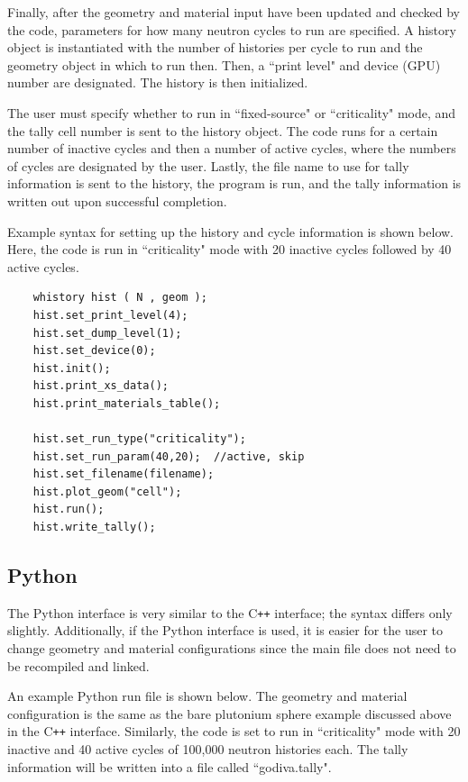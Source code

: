 \documentclass[twoside,a4paper]{refart}
\begin{document}
Finally, after the geometry and material input have been updated and checked by the code, parameters for 
how many neutron cycles to run are specified. A history object is instantiated with the number of
histories per cycle to run and the geometry object in which to run then. Then, a ``print level" and 
device (GPU) number are designated. The history is then initialized.

The user must specify whether to run in ``fixed-source" or ``criticality" mode, and the tally cell number
is sent to the history object. The code runs for a certain number of inactive cycles and then a number of
active cycles, where the numbers of cycles are designated by the user. Lastly, the file name to use for
tally information is sent to the history, the program is run, and the tally information is written out
upon successful completion.

Example syntax for setting up the history and cycle information is shown below. Here, the code is run in
``criticality" mode with 20 inactive cycles followed by 40 active cycles.

\begin{verbatim}
	whistory hist ( N , geom );
	hist.set_print_level(4);
	hist.set_dump_level(1);
	hist.set_device(0);
	hist.init();
	hist.print_xs_data();
	hist.print_materials_table();

	hist.set_run_type("criticality");
	hist.set_run_param(40,20);  //active, skip
	hist.set_filename(filename);
	hist.plot_geom("cell"); 
	hist.run();
	hist.write_tally();
\end{verbatim}

\subsection{Python}

The Python interface is very similar to the C\texttt{++} interface; the syntax differs only slightly.
Additionally, if the Python interface is used, it is easier for the user to change geometry and material 
configurations since the main file does not need to be recompiled and linked.

An example Python run file is shown below. The geometry and material configuration is the same as the
bare plutonium sphere example discussed above in the C\texttt{++} interface. Similarly, the code is set
to run in ``criticality" mode with 20 inactive and 40 active cycles of 100,000 neutron histories each.
The tally information will be written into a file called ``godiva.tally".
\end{document}
